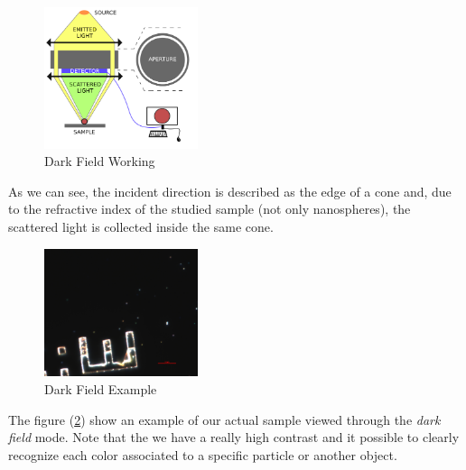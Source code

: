 \documentclass{article}
\numberwithin{equation}{section}
\begin{document}
\begin{figure}[h]
    \centering
    \includegraphics[width=0.4\textwidth, height=0.37\textwidth]{dark_field_working.png}
    \caption{Dark Field Working}
    \label{fig:dark_field_working}
\end{figure}
As we can see, the incident direction is described as the edge of a cone and, due to the refractive index of the studied sample (not only nanospheres), the scattered light is collected inside the same cone.
\begin{figure}[h]
    \centering
    \includegraphics[width=0.4\textwidth, height=0.35\textwidth]{dark_field_ex.png}
    \caption{Dark Field Example}
    \label{fig:dark_field_ex}
\end{figure}
The figure (\ref{fig:dark_field_ex}) show an example of our actual sample viewed through the \textit{dark field} mode. Note that the we have a really high contrast and it possible to clearly recognize each color associated to a specific particle or another object.
\end{document}
